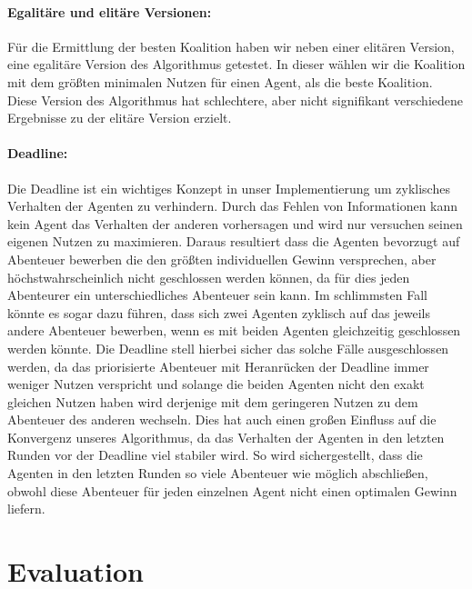 \documentclass[fleqn,10pt]{SelfArx} %
\begin{document}
\paragraph{Egalitäre und elitäre Versionen:} Für die Ermittlung der besten Koalition haben wir neben einer elitären Version, eine egalitäre Version des Algorithmus getestet. In dieser wählen wir die Koalition mit dem größten minimalen Nutzen für einen Agent, als die beste Koalition. Diese Version des Algorithmus hat schlechtere, aber nicht signifikant verschiedene Ergebnisse zu der elitäre Version erzielt.


\paragraph{Deadline:}
Die Deadline ist ein wichtiges Konzept in unser Implementierung um zyklisches Verhalten der Agenten zu verhindern. Durch das Fehlen von Informationen kann kein Agent das Verhalten der anderen vorhersagen und wird nur versuchen seinen eigenen Nutzen zu maximieren. Daraus resultiert dass die Agenten bevorzugt auf Abenteuer bewerben die den größten individuellen Gewinn versprechen, aber höchstwahrscheinlich nicht geschlossen werden können, da für dies jeden Abenteurer ein unterschiedliches Abenteuer sein kann. Im schlimmsten Fall könnte es sogar dazu führen, dass sich zwei Agenten zyklisch auf das jeweils andere Abenteuer bewerben, wenn es mit beiden Agenten gleichzeitig geschlossen werden könnte. Die Deadline stell hierbei sicher das solche Fälle ausgeschlossen werden, da das priorisierte Abenteuer mit Heranrücken der Deadline immer weniger Nutzen verspricht und solange die beiden Agenten nicht den exakt gleichen Nutzen haben wird derjenige mit dem geringeren Nutzen zu dem Abenteuer des anderen wechseln. Dies hat auch einen großen Einfluss auf die Konvergenz unseres Algorithmus, da das Verhalten der Agenten in den letzten Runden vor der Deadline viel stabiler wird. So wird sichergestellt, dass die Agenten in den letzten Runden so viele Abenteuer wie möglich abschließen, obwohl diese Abenteuer für jeden einzelnen Agent nicht einen optimalen Gewinn liefern.

\section{Evaluation}
\label{sec:Evaluation}
\end{document}
